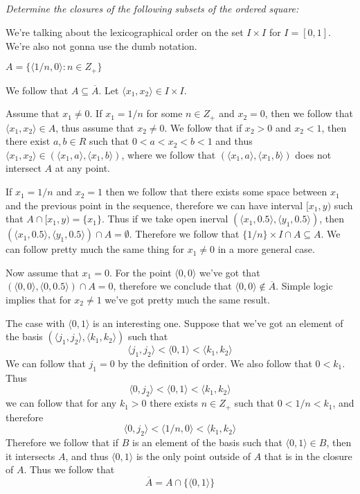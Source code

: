 \documentclass[11pt,oneside,titlepage]{book}
\newcommand{\eangle}[1]{\langle #1 \rangle}
\newcommand{\set}[1]{\{ #1 \}}
\begin{document}
\subsection{}

\textit{Determine the closures of the following subsets of the ordered square:}

We're talking about the lexicographical order on the set $I \times I$ for $I = [0, 1]$.
We're also not gonna use the dumb notation.

\textit{$A = \set{\eangle{1/n, 0}: n \in Z_+}$}

We follow that $A \subseteq \overline{A}$. Let $\eangle{x_1, x_2} \in I \times I$.

Assume that $x_1 \neq 0$. If $x_1 = 1/n$ for some $n \in Z_+$ and $x_2 = 0$, then we follow that
$\eangle{x_1, x_2} \in A$, thus assume that $x_2 \neq 0$. We follow that
if $x_2 > 0$ and $x_2 < 1$, then there exist $a, b \in R$ such that
$0 < a < x_2 < b < 1$ and thus $\eangle{x_1, x_2} \in (\eangle{x_1, a}, \eangle{x_1, b})$,
where we follow that $(\eangle{x_1, a}, \eangle{x_1, b})$ does not intersect $A$
at any point.

If $x_1 = 1/n$ and $x_2 = 1$  then we follow that there exists some space between
$x_1$ and the previous point in the sequence, therefore we can have interval
$[x_1, y)$ such that $A \cap [x_1, y) = \set{x_1}$. 
Thus if we 
take open inerval $(\eangle{x_1, 0.5}, \eangle{y_1, 0.5})$, then
$(\eangle{x_1, 0.5}, \eangle{y_1, 0.5}) \cap A = \emptyset$. Therefore we follow that
$\set{1/n} \times I \cap A \subseteq A$. We can follow pretty much the
same thing for $x_1 \neq 0$ in a more general case.

Now assume that $x_1 = 0$. For the point $\eangle{0, 0}$ we've got that
$(\eangle{0, 0}, \eangle{0, 0.5}) \cap A = 0$, therefore we conclude
that $\eangle{0, 0} \notin \overline{A}$. Simple logic implies that for $x_2 \neq 1$ we've got
pretty much the same result.

The case with $\eangle{0, 1}$ is an interesting one. Suppose that
we've got an element of the basis $(\eangle{j_1, j_2}, \eangle{k_1, k_2})$
such that 
$$\eangle{j_1, j_2} < \eangle{0, 1} < \eangle{k_1, k_2}$$
We can follow that $j_1 = 0$ by the definition of order. We also follow that
$0 < k_1$. Thus
$$\eangle{0, j_2} < \eangle{0, 1} < \eangle{k_1, k_2}$$
we can follow that for any $k_1 > 0$ there exists $n \in Z_+$ such that $0 < 1/n < k_1$,
and therefore
$$\eangle{0, j_2} < \eangle{1/n, 0} < \eangle{k_1, k_2}$$
Therefore we follow that if $B$ is an element of the basis such that $\eangle{0, 1} \in B$,
then it intersects $A$, and thus $\eangle{0, 1}$ is the only point outside of $A$ that
is in the closure of $A$. Thus we follow that
$$\overline{A} = A \cap \set{\eangle{0, 1}}$$
\end{document}
